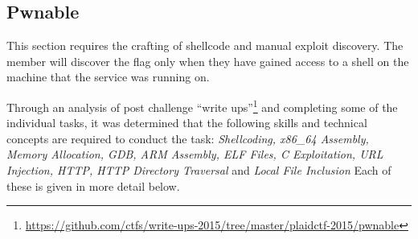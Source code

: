 \documentclass[a4paper,11pt]{report}
\begin{document}
		\subsection{Pwnable}
			This section requires the crafting of shellcode and manual exploit discovery. 
			The member will discover the flag only when they have gained access to a shell on the machine that the service was running on. 

			Through an analysis of post challenge ``write ups''\footnote{\url{https://github.com/ctfs/write-ups-2015/tree/master/plaidctf-2015/pwnable}}
			and completing some of the individual tasks, 
			it was determined that the following skills and technical concepts are required to conduct the task: 
			\textit{Shellcoding, x86\_64 Assembly, Memory Allocation, GDB, ARM Assembly, ELF Files, C Exploitation, URL Injection, HTTP, HTTP Directory Traversal} and \textit{Local File Inclusion}
			Each of these is given in more detail below. 
\end{document}
